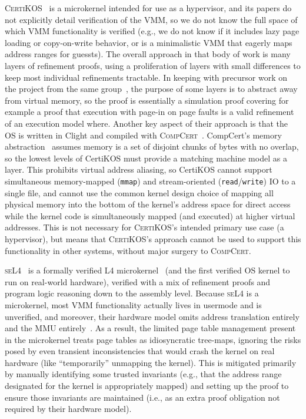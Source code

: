 \textsc{CertiKOS}~\cite{gu15,gu2016certikos,gu2018certikos,chen2016interrupts} is a microkernel intended for use as a hypervisor, and its papers do not explicitly detail verification of the VMM, so we do not know the full space of which VMM functionality is verified (e.g., we do not know if it includes lazy page loading or copy-on-write behavior, or is a minimalistic VMM that eagerly maps address ranges for guessts). The overall approach in that body of work is many layers of refinement proofs, using a proliferation of layers with small differences to keep most individual refinements tractable. In keeping with precursor work on the project from the same group~\cite{vaynberg2012compositional}, the purpose of some layers is to abstract away from virtual memory, so the proof is essentially a simulation proof covering for example a proof that execution with page-in on page faults is a valid refinement of an execution model where.
Another key aspect of their approach is that the OS is written in Clight and compiled with \textsc{CompCert}~\cite{blazy2006formal,leroy2009formally,leroy2008formal}.
CompCert's memory abstraction~\cite{leroy2008formal} assumes
memory is a set of disjoint chunks of bytes with no overlap, so the lowest levels of CertiKOS must provide a matching machine model as a layer. This prohibits virtual address aliasing, so CertiKOS cannot support simultaneous memory-mapped (\texttt{mmap}) and stream-oriented (\texttt{read}/\texttt{write}) IO to a single file, and cannot use
the common kernel design choice of mapping all physical memory into the bottom of the kernel's address space for direct access while the kernel code is simultaneously mapped (and executed) at higher virtual addresses.
This is not necessary for \textsc{CertiKOS}'s intended primary use case (a hypervisor), but means that \textsc{CertiKOS}'s approach cannot be used to support this functionality in other systems, without major surgery to \textsc{CompCert}.

\textsc{seL4}~\cite{Klein2009seL4,seL4TOCS,Sewell2013translation} is a formally verified L4 microkernel~\cite{Liedtke1995,Liedtke1996} (and the first verified OS kernel to run on real-world hardware), verified with a mix of refinement proofs and program logic reasoning down to the assembly level.
Because \textsc{seL4} is a microkernel, most VMM functionality actually lives in usermode and is unverified, and moreover, their hardware model omits address translation entirely and the MMU entirely~\cite{Klein2009seL4,seL4TOCS}. As a result, the limited page table management present in the microkernel treats page tables as idiosyncratic tree-maps, ignoring the risks posed by even transient inconsistencies that would crash the kernel on real hardware (like ``temporarily'' unmapping the kernel). This is mitigated primarily by manually identifying some trusted invariants (e.g., that the address range designated for the kernel is appropriately mapped) and setting up the proof to ensure those invariants are maintained (i.e., as an extra proof obligation not required by their hardware model).

